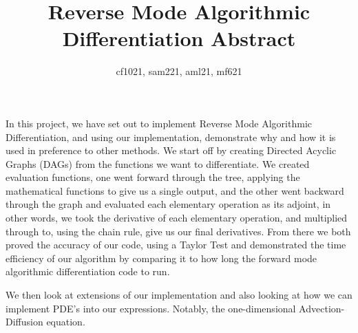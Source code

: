\documentclass{article}
\title{Reverse Mode Algorithmic Differentiation Abstract}
\author{cf1021, sam221, aml21, mf621}
\date{}
\begin{document}
\maketitle

In this project, we have set out to implement Reverse Mode Algorithmic Differentiation, and using our implementation, demonstrate why and how it is used in preference to other methods. We start off by creating Directed Acyclic Graphs (DAGs) from the functions we want to differentiate. We created evaluation functions, one went forward through the tree, applying the mathematical functions to give us a single output, and the other went backward through the graph and evaluated each elementary operation as its adjoint, in other words, we took the derivative of each elementary operation, and multiplied through to, using the chain rule, give us our final derivatives. From there we both proved the accuracy of our code, using a Taylor Test and demonstrated the time efficiency of our algorithm by comparing it to how long the forward mode algorithmic differentiation code to run.

We then look at extensions of our implementation and also looking at how we can implement PDE's into our expressions. Notably, the one-dimensional Advection-Diffusion equation.
\end{document}
